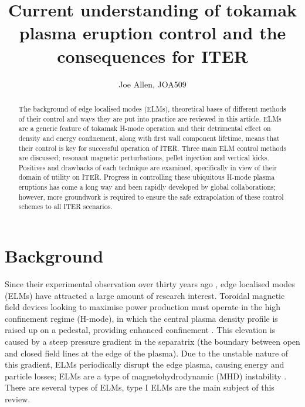 \documentclass[11pt, twocolumn]{article}  %
\begin{document}
\title{Current understanding of tokamak plasma eruption control and the consequences for ITER}
\author{Joe Allen, JOA509}
\maketitle

\begin{abstract}
The background of edge localised modes (ELMs), theoretical bases of different methods of their control and ways they are put into practice are reviewed in this article. ELMs are a generic feature of tokamak H-mode operation and their detrimental effect on density and energy confinement, along with first wall component lifetime, means that their control is key for successful operation of ITER. Three main ELM control methods are discussed; resonant magnetic perturbations, pellet injection and vertical kicks. Positives and drawbacks of each technique are examined, specifically in view of their domain of utility on ITER. Progress in controlling these ubiquitous H-mode plasma eruptions has come a long way and been rapidly developed by global collaborations; however, more groundwork is required to ensure the safe extrapolation of these control schemes to all ITER scenarios. 
\end{abstract}

\tableofcontents

\section{Background}\label{sec:Bg}
Since their experimental observation over thirty years ago \cite{Keilhacker1984}, edge localised modes (ELMs) have attracted a large amount of research interest. Toroidal magnetic field devices looking to maximise power production must operate in the high confinement regime (H-mode), in which the central plasma density profile is raised up on a pedestal, providing enhanced confinement \cite{Wagner2007}. This elevation is caused by a steep pressure gradient in the separatrix (the boundary between open and closed field lines at the edge of the plasma). Due to the unstable nature of this gradient, ELMs periodically disrupt the edge plasma, causing energy and particle losses; ELMs are a type of magnetohydrodynamic (MHD) instability \cite{Zohm1996}. There are several types of ELMs, type I ELMs are the main subject of this review.
\end{document}
